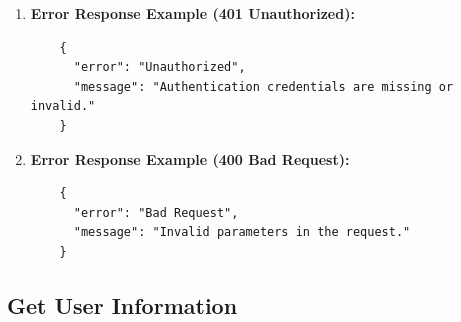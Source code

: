 \documentclass[a4 paper, 12pt]{article}
\begin{document}
\begin{enumerate}
\begin{enumerate}
    \item \textbf{Error Response Example (401 Unauthorized):}
    \begin{verbatim}
    {
      "error": "Unauthorized",
      "message": "Authentication credentials are missing or invalid."
    }
    \end{verbatim}

    \item \textbf{Error Response Example (400 Bad Request):}
    \begin{verbatim}
    {
      "error": "Bad Request",
      "message": "Invalid parameters in the request."
    }
    \end{verbatim}
  \end{enumerate}

\end{enumerate}
\subsection{Get User Information}
\end{document}
